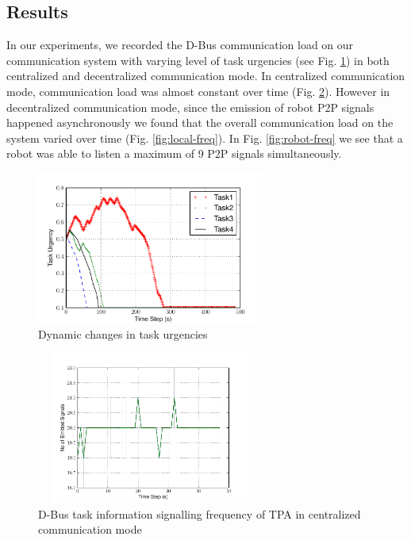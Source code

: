 \documentclass{ifacconf}
\begin{document}
\subsection{Results}
In our experiments, we recorded the D-Bus communication load on our communication system with varying level of task urgencies (see Fig. \ref{fig:task-urgency}) in both centralized and decentralized communication mode. In  centralized communication mode, communication load was almost constant over time (Fig. \ref{fig:global-freq}).  However in decentralized communication mode, since the emission of robot P2P signals happened asynchronously we found that the overall communication load on the system varied over time (Fig. \ref{fig:local-freq}). In Fig. \ref{fig:robot-freq} we see that a robot was able to listen a maximum of 9 P2P signals simultaneously.
\begin{figure}
\begin{center}
\includegraphics[width=7.5cm,height=5cm]{./images/PlotUrgencyLog-2010Feb15-171017}    %
\caption{Dynamic changes in task urgencies} 
\label{fig:task-urgency}
\end{center}
\end{figure}
\begin{figure}
\begin{center}
\includegraphics[width=7.5cm,height=5cm]{./images/Global-SignalingFreqStat}    %
\caption{D-Bus task information signalling frequency of TPA in centralized communication mode} 
\label{fig:global-freq}
\end{center}
\end{figure}
\end{document}
